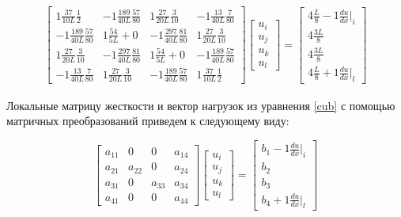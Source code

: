 \begin{align}\label{cub}
\begin{bmatrix}1\frac{37}{10L} \frac{1}{2} &   -1 \frac{189}{40L} \frac{57}{80} & 1\frac{27}{20L} \frac{3}{10} &   -1 \frac{13}{40L}   \frac{7}{80}\\
	  -1 \frac{189}{40L}  \frac{57}{80} & 1\frac{54}{5L}+0 &   -1 \frac{297}{40L} \frac{81}{80} & 1\frac{27}{20L}  \frac{3}{10} \\
	1\frac{27}{20L}   \frac{3}{10} &   -1 \frac{297}{40L} \frac{81}{80} & 1\frac{54}{5L}+0 &   -1 \frac{189}{40L}  \frac{57}{80} \\
	  -1 \frac{13}{40L}  \frac{7}{80} & 1\frac{27}{20L} \frac{3}{10} &   -1 \frac{189}{40L} \frac{57}{80} & 1\frac{37}{10L}  \frac{1}{2}
\end{bmatrix}
\begin{bmatrix}
	u_i \\
	u_j \\
	u_k\\
	u_l
\end{bmatrix}
=
\begin{bmatrix}
    4\frac{L}{8}   -1  \frac{du}{dx}|_i \\
	4\frac{3L}{8}\\
	4\frac{3L}{8}\\
	4\frac{L}{8}   +1  \frac{du}{dx}|_l
\end{bmatrix}
\end{align}

Локальные матрицу жесткости и вектор нагрузок из уравнения \ref{cub} с помощью матричных преобразований приведем к следующему виду:

$$ \begin{bmatrix}
a_{11}     &  0  & 0  &  a_{14}\\
a_{21}     &  a_{22}  & 0  &  a_{24}\\
a_{31}     &  0  &  a_{33} &  a_{34}\\
a_{41}     &  0  & 0  &  a_{44}
\end{bmatrix}
\begin{bmatrix}
u_i \\
u_j \\
u_k\\
u_l
\end{bmatrix} =
\begin{bmatrix}
b_1   -1  \frac{du}{dx}|_i \\
b_2\\
b_3\\
b_4   +1  \frac{du}{dx}|_l
\end{bmatrix}$$

